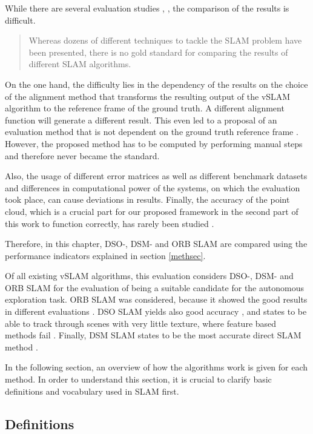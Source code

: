While there are several evaluation studies \cite{eval1} \cite{eval2} \cite{pq} \cite{orb}, \cite{dso}, the comparison of the results is difficult. 

  \begin{quote}
Whereas dozens of different techniques to tackle the SLAM problem have been presented, there is no gold standard for comparing the results of different SLAM algorithms. \cite{align1}
  \end{quote}

On the one hand, the difficulty lies in the dependency of the results on the choice of the 
alignment method that transforms the resulting output of the vSLAM algorithm to the reference frame of the ground truth. 
A different alignment function will generate a different result. This even led to a proposal of an evaluation method that is not dependent on the ground truth reference 
frame \cite{align1}. However, the proposed method has to be computed by performing manual steps 
and therefore never became the standard.

Also, the usage of different error matrices as well as different benchmark datasets and differences in computational power of the systems,
 on which the evaluation took place, can cause deviations in results. 
Finally, the accuracy of the point cloud, which is a crucial part for our proposed framework in the second part of this work to function correctly, has rarely been studied \cite{pq}. 

Therefore, in this chapter, DSO-, DSM- and ORB SLAM are compared using the performance indicators explained in section \ref{methsec}. 


Of all existing vSLAM algorithms, this evaluation considers DSO-, DSM- and ORB SLAM for the evaluation of being a suitable candidate for the autonomous exploration task.
ORB SLAM was considered, because it showed the good results in different evaluations \cite{eval1} \cite{eval3}. 
DSO SLAM yields also good accuracy \cite{eval3}, and states to be able to track through scenes with very little texture, where feature based methods fail \cite{dso}.
Finally, DSM SLAM states to be the most accurate direct SLAM method \cite{dsm}.   

In the following section, an overview of how the algorithms work is given for each method. In order to understand this section, it is crucial to clarify basic definitions 
and vocabulary used in SLAM first. 

	\subsection{Definitions}
		
